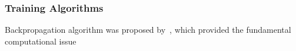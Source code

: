 \subsubsection{Training Algorithms}
Backpropagation algorithm was proposed by~\citet{werbos1975beyond}, which provided the fundamental computational issue